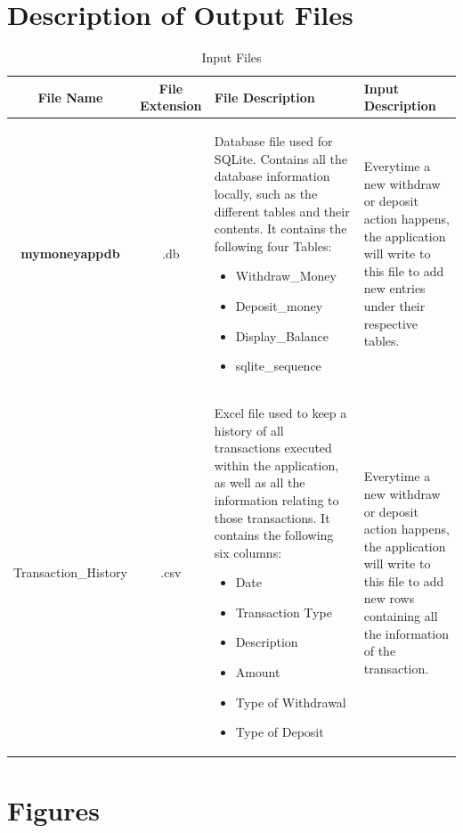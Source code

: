 \documentclass[12pt]{article}
\begin{document}
\section{Description of Output Files}

\begin{table}[H]
\caption{Input Files}
\begin{center}
\begin{tabular}{|c|c|p{3cm}|p{2cm}}
\hline
  \bf File Name & \bf File Extension & \bf File Description & \bf Input Description \\\hline
	\bf mymoneyappdb &
		.db &
Database file used for SQLite. Contains all the database information locally, such as the different tables and their contents. It contains the following four Tables: 
\begin{itemize} 
	\item Withdraw\_Money
	\item Deposit\_money
	\item Display\_Balance
	\item sqlite\_sequence
\end{itemize}
		& Everytime a new withdraw or deposit action happens, the application will write to this file to add new entries under their respective tables.   \\
		\hline
		Transaction\_History	&
		.csv 	&
Excel file used to keep a history of all transactions executed within the application, as well as all the information relating to those transactions. It contains the following six columns:
		\begin{itemize} 
		\item Date
		\item Transaction Type
		\item Description
		\item Amount
		\item Type of Withdrawal
		\item Type of Deposit
		\end{itemize}
	& Everytime a new withdraw or deposit action happens, the application will write to this file to add new rows containing all the information of the transaction.
\end{tabular}
\end{center}
\end{table}


\clearpage 
\section{Figures}
\end{document}
